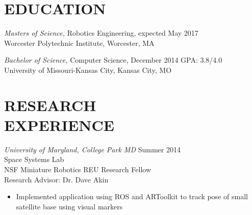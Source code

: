 \documentclass[line,margin]{res}
\begin{document}
\address{\hfill victoria.chen.wu@gmail.com  \textbar \textbar \hspace{1 mm} vptarmigan.wordpress.com \textbar \textbar \hspace{1 mm} (913) 235 - 1070 
} 

 
\begin{resume}
 
\section{EDUCATION} 

{\sl Masters of Science,} Robotics Engineering, expected May 2017 	\\
                Worcester Polytechnic Institute, Worcester, MA 

{\sl Bachelor of Science,} Computer Science, December 2014 	\hfill GPA: 3.8/4.0\\
                University of Missouri-Kansas City, Kansas City, MO 
\section {RESEARCH \\ EXPERIENCE}
		{\sl University of Maryland, College Park MD}  \hfill  Summer 2014\\
		Space Systems Lab\\
		NSF Miniature Robotics REU Research Fellow \\
		Research Advisor: Dr. Dave Akin 
                 \begin{itemize}[leftmargin=5mm]  \itemsep -2pt %
		 \item Implemented application using ROS and ARToolkit to track pose of small satellite base using visual markers


\end{itemize}
\end{resume}
\end{document}
